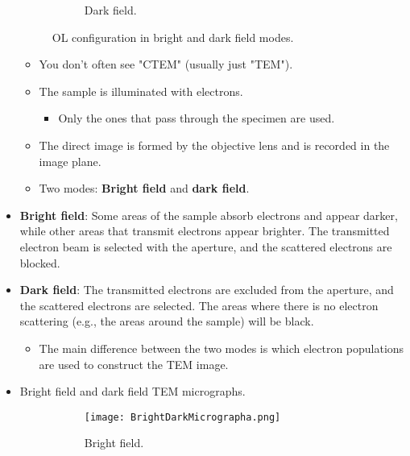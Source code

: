 \documentclass[../notes.tex]{subfiles}
\begin{document}
\begin{itemize}
\begin{figure}[H]
\begin{subfigure}[b]{0.49\linewidth}
            \caption{Dark field.}
            \label{fig:brightDarkOLb}
        \end{subfigure}
        \caption{OL configuration in bright and dark field modes.}
        \label{fig:brightDarkOL}
    \end{figure}
    \begin{itemize}
        \item You don't often see "CTEM" (usually just "TEM").
        \item The sample is illuminated with electrons.
        \begin{itemize}
            \item Only the ones that pass through the specimen are used.
        \end{itemize}
        \item The direct image is formed by the objective lens and is recorded in the image plane.
        \item Two modes: \textbf{Bright field} and \textbf{dark field}.
    \end{itemize}
    \item \textbf{Bright field}: Some areas of the sample absorb electrons and appear darker, while other areas that transmit electrons appear brighter. The transmitted electron beam is selected with the aperture, and the scattered electrons are blocked.
    \item \textbf{Dark field}: The transmitted electrons are excluded from the aperture, and the scattered electrons are selected. The areas where there is no electron scattering (e.g., the areas around the sample) will be black.
    \begin{itemize}
        \item The main difference between the two modes is which electron populations are used to construct the TEM image.
    \end{itemize}
    \item Bright field and dark field TEM micrographs.
    \begin{figure}[h!]
        \centering
        \begin{subfigure}[b]{0.3\linewidth}
            \centering
            \texttt{[image: BrightDarkMicrographa.png]}
            \caption{Bright field.}
            \label{fig:BrightDarkMicrographa}
        \end{subfigure}
        \begin{subfigure}[b]{0.3\linewidth}

\end{subfigure}
\end{figure}
\end{itemize}
\end{document}
